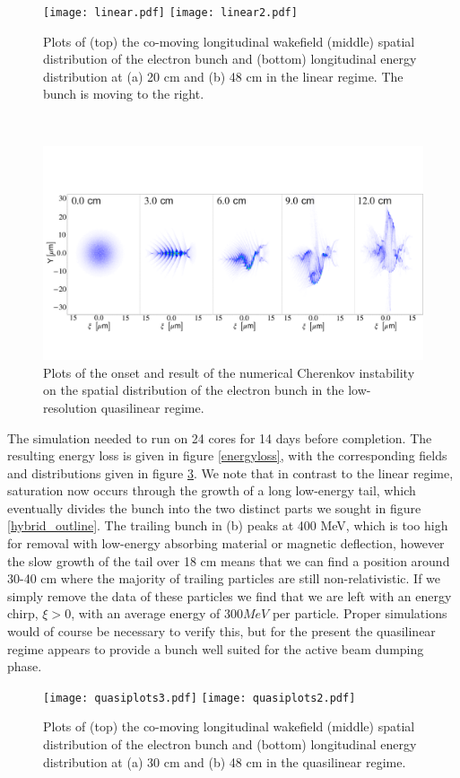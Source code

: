 \begin{figure}
\centering
\texttt{[image: linear.pdf]}\hspace{24pt}
\texttt{[image: linear2.pdf]}
\caption{\small{Plots of (top) the co-moving longitudinal wakefield (middle) spatial distribution of the electron bunch and (bottom) longitudinal energy distribution at (a) 20 cm and (b) 48 cm in the linear regime. The bunch is moving to the right.}\vspace{-5pt}}
\label{linearplots}
\end{figure}
\vspace{-4pt}\\
\begin{figure}[!ht]
\centering
\includegraphics[width=\textwidth]{CherenkovInstability}
\caption{\small{Plots of the onset and result of the numerical Cherenkov instability on the spatial distribution of the electron bunch in the low-resolution quasilinear regime.}}
\label{cherenkov}
\end{figure}
\clearpage
\noindent The simulation needed to run on 24 cores for 14 days before completion. The resulting energy loss is given in figure \ref{energyloss}, with the corresponding fields and distributions given in figure \ref{quasiplots}. We note that in contrast to the linear regime, saturation now occurs through the growth of a long low-energy tail, which eventually divides the bunch into the two distinct parts we sought in figure \ref{hybrid_outline}. The trailing bunch in (b) peaks at 400 MeV, which is too high for removal with low-energy absorbing material or magnetic deflection, however the slow growth of the tail over 18 cm means that we can find a position around 30-40 cm where the majority of trailing particles are still non-relativistic. If we simply remove the data of these particles we find that we are left with an energy chirp, $\xi>0$, with an average energy of $300 MeV$ per particle. Proper simulations would of course be necessary to verify this, but for the present the quasilinear regime appears to provide a bunch well suited for the active beam dumping phase. 

\begin{figure}
\centering
\texttt{[image: quasiplots3.pdf]}\hspace{24pt}
\texttt{[image: quasiplots2.pdf]}
\caption{\small{Plots of (top) the co-moving longitudinal wakefield (middle) spatial distribution of the electron bunch and (bottom) longitudinal energy distribution at (a) 30 cm and (b) 48 cm in the quasilinear regime. }}
\label{quasiplots}
\end{figure}
